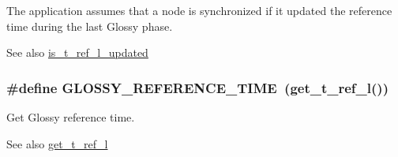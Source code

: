 The application assumes that a node is synchronized if it updated the reference time during the last Glossy phase. \begin{DoxySeeAlso}{See also}
\hyperlink{group__glossy__sync_gae7e475746ec86ae6dd8ca9ece642faf8}{is\_\-t\_\-ref\_\-l\_\-updated} 
\end{DoxySeeAlso}
\hypertarget{group__glossy-test-defines_ga3eab42e5e2d60ea806b4c22447a9fb85}{
\subsubsection[{GLOSSY\_\-REFERENCE\_\-TIME}]{\setlength{\rightskip}{0pt plus 5cm}\#define GLOSSY\_\-REFERENCE\_\-TIME~(get\_\-t\_\-ref\_\-l())}}
\label{group__glossy-test-defines_ga3eab42e5e2d60ea806b4c22447a9fb85}


Get Glossy reference time. 

\begin{DoxySeeAlso}{See also}
\hyperlink{group__glossy__sync_gaa37a5474c90f7747d0f5054dc1a03764}{get\_\-t\_\-ref\_\-l} 
\end{DoxySeeAlso}
